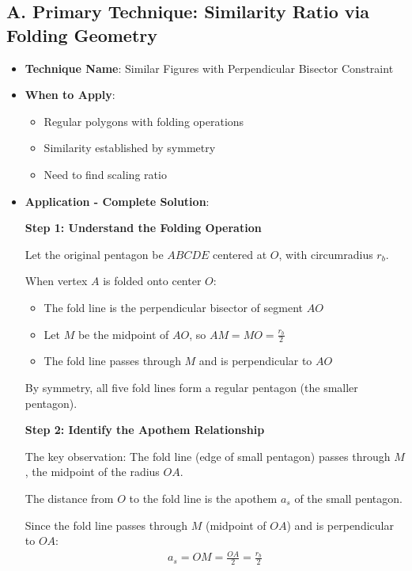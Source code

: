 \documentclass[12pt]{article}
\begin{document}
\begin{techniquesbox}
\subsection*{A. Primary Technique: Similarity Ratio via Folding Geometry}
\begin{itemize}[leftmargin=*]
    \item \textbf{Technique Name}: Similar Figures with Perpendicular Bisector Constraint
    \item \textbf{When to Apply}: 
    \begin{itemize}
        \item Regular polygons with folding operations
        \item Similarity established by symmetry
        \item Need to find scaling ratio
    \end{itemize}
    \item \textbf{Application - Complete Solution}: 
    
    \textbf{Step 1: Understand the Folding Operation}
    
    Let the original pentagon be $ABCDE$ centered at $O$, with circumradius $r_b$.
    
    When vertex $A$ is folded onto center $O$:
    \begin{itemize}
        \item The fold line is the perpendicular bisector of segment $AO$
        \item Let $M$ be the midpoint of $AO$, so $AM = MO = \frac{r_b}{2}$
        \item The fold line passes through $M$ and is perpendicular to $AO$
    \end{itemize}
    
    By symmetry, all five fold lines form a regular pentagon (the smaller pentagon).
    
    \textbf{Step 2: Identify the Apothem Relationship}
    
    The key observation: The fold line (edge of small pentagon) passes through $M$, the midpoint of the radius $OA$.
    
    The distance from $O$ to the fold line is the apothem $a_s$ of the small pentagon.
    
    Since the fold line passes through $M$ (midpoint of $OA$) and is perpendicular to $OA$:
    \begin{align*}
    a_s = OM = \frac{OA}{2} = \frac{r_b}{2}
    \end{align*}
    

\end{itemize}
\end{techniquesbox}
\end{document}
